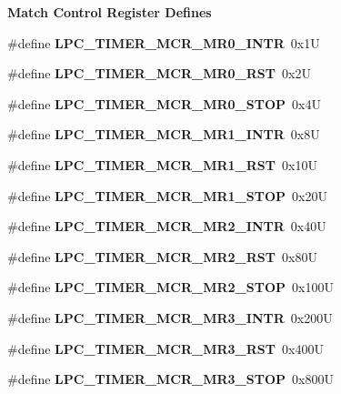 \begin{Indent}\textbf{ Match Control Register Defines}\par
\begin{DoxyCompactItemize}
\item 
\#define {\bfseries L\+P\+C\+\_\+\+T\+I\+M\+E\+R\+\_\+\+M\+C\+R\+\_\+\+M\+R0\+\_\+\+I\+N\+TR}~0x1U
\item 
\#define {\bfseries L\+P\+C\+\_\+\+T\+I\+M\+E\+R\+\_\+\+M\+C\+R\+\_\+\+M\+R0\+\_\+\+R\+ST}~0x2U
\item 
\#define {\bfseries L\+P\+C\+\_\+\+T\+I\+M\+E\+R\+\_\+\+M\+C\+R\+\_\+\+M\+R0\+\_\+\+S\+T\+OP}~0x4U
\item 
\#define {\bfseries L\+P\+C\+\_\+\+T\+I\+M\+E\+R\+\_\+\+M\+C\+R\+\_\+\+M\+R1\+\_\+\+I\+N\+TR}~0x8U
\item 
\#define {\bfseries L\+P\+C\+\_\+\+T\+I\+M\+E\+R\+\_\+\+M\+C\+R\+\_\+\+M\+R1\+\_\+\+R\+ST}~0x10U
\item 
\#define {\bfseries L\+P\+C\+\_\+\+T\+I\+M\+E\+R\+\_\+\+M\+C\+R\+\_\+\+M\+R1\+\_\+\+S\+T\+OP}~0x20U
\item 
\#define {\bfseries L\+P\+C\+\_\+\+T\+I\+M\+E\+R\+\_\+\+M\+C\+R\+\_\+\+M\+R2\+\_\+\+I\+N\+TR}~0x40U
\item 
\#define {\bfseries L\+P\+C\+\_\+\+T\+I\+M\+E\+R\+\_\+\+M\+C\+R\+\_\+\+M\+R2\+\_\+\+R\+ST}~0x80U
\item 
\#define {\bfseries L\+P\+C\+\_\+\+T\+I\+M\+E\+R\+\_\+\+M\+C\+R\+\_\+\+M\+R2\+\_\+\+S\+T\+OP}~0x100U
\item 
\#define {\bfseries L\+P\+C\+\_\+\+T\+I\+M\+E\+R\+\_\+\+M\+C\+R\+\_\+\+M\+R3\+\_\+\+I\+N\+TR}~0x200U
\item 
\#define {\bfseries L\+P\+C\+\_\+\+T\+I\+M\+E\+R\+\_\+\+M\+C\+R\+\_\+\+M\+R3\+\_\+\+R\+ST}~0x400U
\item 
\#define {\bfseries L\+P\+C\+\_\+\+T\+I\+M\+E\+R\+\_\+\+M\+C\+R\+\_\+\+M\+R3\+\_\+\+S\+T\+OP}~0x800U
\end{DoxyCompactItemize}
\end{Indent}
